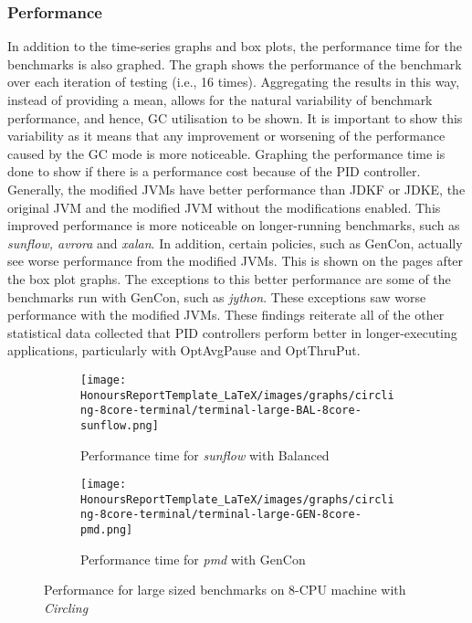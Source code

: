 \subsubsection{Performance}
In addition to the time-series graphs and box plots, the performance
time for the benchmarks is also graphed. The graph shows the performance of the benchmark over each iteration of testing (i.e., 16 times). Aggregating the results in this way, instead of providing a mean, allows for the natural variability of benchmark performance, and hence, GC utilisation to be shown. It is important to show this variability as it means that any improvement or worsening of the performance caused by the GC mode is more noticeable. Graphing the performance time is done to show if there
is a performance cost because of the PID controller. Generally, the
modified JVMs have better performance than JDKF or JDKE, the original
JVM and the modified JVM without the modifications enabled. This
improved performance is more noticeable on longer-running benchmarks,
such as \emph{sunflow, avrora} and \emph{xalan}. In addition, certain policies, such as GenCon, actually see worse performance from the modified JVMs. This is shown on the pages after the box plot graphs. 
\newline\newline
The exceptions to this better performance are some of the benchmarks run
with GenCon, such as \emph{jython}. These exceptions saw worse
performance with the modified JVMs. These findings reiterate all of the
other statistical data collected that PID controllers perform better in
longer-executing applications, particularly with OptAvgPause and
OptThruPut.
\begin{figure} [H]
\begin{subfigure}{1\textwidth}
\texttt{[image: HonoursReportTemplate\_LaTeX/images/graphs/circling-8core-terminal/terminal-large-BAL-8core-sunflow.png]}
       \caption{Performance time for \emph{sunflow} with Balanced}
\end{subfigure}
 \begin{subfigure}{1\textwidth}
\texttt{[image: HonoursReportTemplate\_LaTeX/images/graphs/circling-8core-terminal/terminal-large-GEN-8core-pmd.png]}
       \caption{Performance time for \emph{pmd} with GenCon}
\end{subfigure}

\caption{Performance for large sized benchmarks on 8-CPU machine with \emph{Circling} }
\end{figure}
